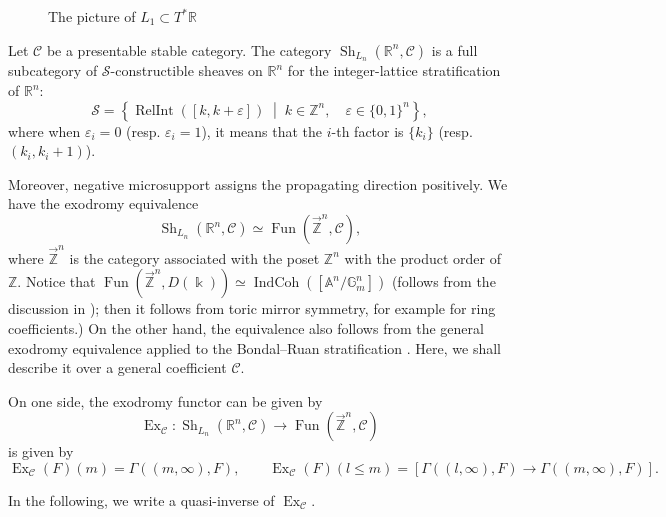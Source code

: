 \documentclass[11pt]{amsart}
\numberwithin{equation}{section}
\theoremstyle{plain}
\theoremstyle{definition}
\theoremstyle{remark}
\newcommand{\bZ} { {\mathbb{Z}}}
\newcommand{\bR} { {\mathbb{R}}}
\newcommand{\cC} { {\mathcal{C}}}
\newcommand{\Sh} { {\operatorname{Sh}}}
\newcommand\Fun{\operatorname{Fun}}
\newcommand{\rarbZ} { \overrightarrow{\mathbb{Z}}}
\newcommand{\Ex}{\operatorname{Ex}}
\begin{document}
\begin{figure}[htbp]
    \centering
{}
    \caption{The picture of $L_1\subset T^*\bR$}
    \label{fig: picture of lattice strata in dim=1}
\end{figure}

Let $\cC$ be a presentable stable category. The category $\Sh_{L_n}(\bR^n,\cC)$ is a full subcategory of $\mathcal{S}$-constructible sheaves on $\bR^n$ for the integer-lattice stratification of $\bR^n$:
\[
\mathcal{S}
=
\left\{
\operatorname{RelInt}([k,k+\varepsilon])
\;\middle|\;
k\in\bZ^n,\quad \varepsilon\in\{0,1\}^n
\right\},
\]
where when $\varepsilon_i=0$ (resp. $\varepsilon_i=1$), it means that the $i$-th factor is $\{k_i\}$ (resp. $(k_i,k_i+1)$).

Moreover, negative microsupport assigns the propagating direction positively. We have the exodromy equivalence 
\[ \Sh_{L_n}(\bR^n,\cC)\simeq \Fun(\rarbZ^n,\cC),\]
where $\rarbZ^n$ is the category associated with the poset $\bZ^n$ with the product order of $\bZ$. Notice that $\Fun(\rarbZ^n,D(\Bbbk))\simeq \operatorname{IndCoh}([\mathbb{A}^n/\mathbb{G}_m^n])$ (follows from the discussion in \cite[Tag 0EKL]{StacksProject}); then it follows from toric mirror symmetry, for example \cite{ToricMSrevisted-Shende,SunFunctorialityToricCCC} for ring coefficients.) On the other hand, the equivalence also follows from the general exodromy equivalence applied to the Bondal--Ruan stratification \cite[Example 5.3.10]{HainePortaTeyssier-conicality}. Here, we shall describe it over a general coefficient $\cC$.


On one side, the exodromy functor can be given by
\[\Ex_\cC: \Sh_{L_n}(\bR^n,\cC) \to \Fun(\rarbZ^n,\cC)\]
is given by
\[\Ex_\cC(F)(m)=\Gamma((m,\infty),F),\qquad  \Ex_\cC(F)(l\leq m)=[\Gamma((l,\infty),F)\to \Gamma((m,\infty),F)].\]

\medskip

In the following, we write a quasi-inverse of $\Ex_\cC$. 
\end{document}
